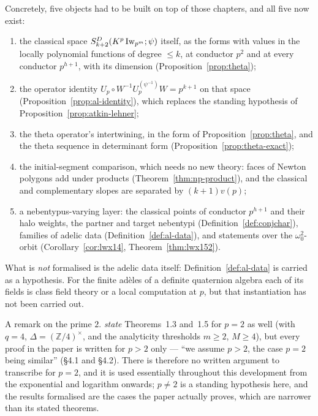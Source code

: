 Concretely, five objects had to be built on top of those chapters, and all five now exist:

\begin{enumerate}
  \item the classical space $S^{D}_{k+2}(K^{p}\operatorname{Iw}_{p^{m}};\psi)$ itself, as the forms with values
    in the locally polynomial functions of degree $\leq k$, at conductor $p^{2}$ and at every
    conductor $p^{h+1}$, with its dimension (Proposition~\ref{prop:theta});
  \item the operator identity $U_p \circ W^{-1} U_p^{(\psi^{-1})} W = p^{k+1}$ on that space
    (Proposition~\ref{prop:al-identity}), which replaces the standing hypothesis of
    Proposition~\ref{prop:atkin-lehner};
  \item the theta operator's intertwining, in the form of Proposition~\ref{prop:theta}, and the
    theta sequence in determinant form (Proposition~\ref{prop:theta-exact});
  \item the initial-segment comparison, which needs no new theory: faces of Newton polygons add
    under products (Theorem~\ref{thm:np-product}), and the classical and complementary slopes are
    separated by $(k+1)v(p)$;
  \item a nebentypus-varying layer: the classical points of conductor $p^{h+1}$ and their halo
    weights, the partner and target nebentypi (Definition~\ref{def:conjchar}), families of adelic
    data (Definition~\ref{def:al-data}), and statements over the $\omega_0^{2}$-orbit
    (Corollary~\ref{cor:lwx14}, Theorem~\ref{thm:lwx152}).
\end{enumerate}

What is \emph{not} formalised is the adelic data itself: Definition~\ref{def:al-data} is carried as
a hypothesis.  For the finite ad\`eles of a definite quaternion algebra each of its fields is class
field theory or a local computation at $p$, but that instantiation has not been carried out.

A remark on the prime $2$.  \cite{LWX} \emph{state} Theorems~1.3 and~1.5 for $p = 2$ as well
(with $q = 4$, $\Delta = (\mathbb{Z}/4)^\times$, and the analyticity thresholds $m \ge 2$,
$M \ge 4$), but every proof in the paper is written for $p > 2$ only --- ``we assume $p > 2$, the
case $p = 2$ being similar'' (\S4.1 and \S4.2).  There is therefore no written argument to
transcribe for $p = 2$, and it is used essentially throughout this development from the
exponential and logarithm onwards; $p \ne 2$ is a standing hypothesis here, and the results
formalised are the cases the paper actually proves, which are narrower than its stated theorems.

